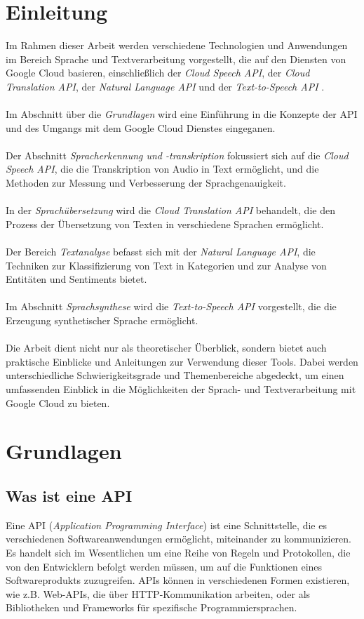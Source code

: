 \documentclass[12pt,a4paper]{article}
\begin{document}
\section*{Einleitung}
Im Rahmen dieser Arbeit werden verschiedene Technologien und Anwendungen im Bereich Sprache und Textverarbeitung vorgestellt, die auf den Diensten von Google Cloud basieren, einschließlich der \textit{Cloud Speech API}, der \textit{Cloud Translation API}, der \textit{Natural Language API} und der \textit{Text-to-Speech API} \cite{google}.
\\ \\
Im Abschnitt über die \textit{Grundlagen} wird eine Einführung in die Konzepte der API und des Umgangs mit dem Google Cloud Dienstes eingeganen.
\\ \\
Der Abschnitt \textit{Spracherkennung und -transkription} fokussiert sich auf die \textit{Cloud Speech API}, die die Transkription von Audio in Text ermöglicht, und die Methoden zur Messung und Verbesserung der Sprachgenauigkeit.
\\ \\
In der \textit{Sprachübersetzung} wird die \textit{Cloud Translation API} behandelt, die den Prozess der Übersetzung von Texten in verschiedene Sprachen ermöglicht.
\\ \\
Der Bereich \textit{Textanalyse} befasst sich mit der \textit{Natural Language API}, die Techniken zur Klassifizierung von Text in Kategorien und zur Analyse von Entitäten und Sentiments bietet.
\\ \\
Im Abschnitt \textit{Sprachsynthese} wird die \textit{Text-to-Speech API} vorgestellt, die die Erzeugung synthetischer Sprache ermöglicht.
\\ \\
Die Arbeit dient nicht nur als theoretischer Überblick, sondern bietet auch praktische Einblicke und Anleitungen zur Verwendung dieser Tools. Dabei werden unterschiedliche Schwierigkeitsgrade und Themenbereiche abgedeckt, um einen umfassenden Einblick in die Möglichkeiten der Sprach- und Textverarbeitung mit Google Cloud zu bieten.

	
\newpage

\section{Grundlagen}
\subsection{Was ist eine API}
Eine API (\textit{Application Programming Interface}) ist eine Schnittstelle, die es verschiedenen Softwareanwendungen ermöglicht, miteinander zu kommunizieren. Es handelt sich im Wesentlichen um eine Reihe von Regeln und Protokollen, die von den Entwicklern befolgt werden müssen, um auf die Funktionen eines Softwareprodukts zuzugreifen. APIs können in verschiedenen Formen existieren, wie z.B. Web-APIs, die über HTTP-Kommunikation arbeiten, oder als Bibliotheken und Frameworks für spezifische Programmiersprachen.
\end{document}
